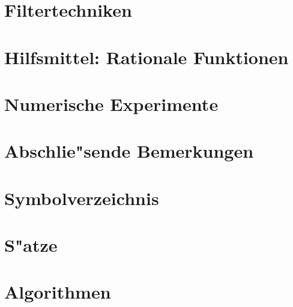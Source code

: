\documentclass[11pt, twoside]{report}
\begin{document}
\chapter{Filtertechniken} %


\chapter{Hilfsmittel: Rationale Funktionen}%


\chapter{Numerische Experimente}\label{numExp}


\chapter{Abschlie"sende Bemerkungen}


\appendix
\chapter{Symbolverzeichnis}\label{appNotation}


\chapter{S"atze}\label{appTheorems}


\chapter{Algorithmen}\label{appAlgorithms}


\nocite{*}
\printbibliography[heading=bibintoc]
\end{document}

